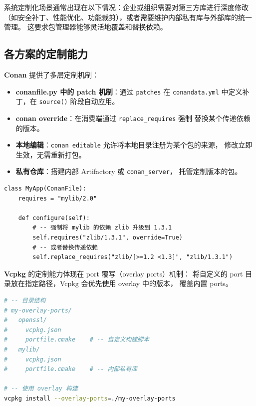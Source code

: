 \documentclass[12pt,a4paper,fontset=fandol]{ctexbook}
\begin{document}
系统定制化场景通常出现在以下情况：企业或组织需要对第三方库进行深度修改
（如安全补丁、性能优化、功能裁剪），或者需要维护内部私有库与外部库的统一管理。
这要求包管理器能够灵活地覆盖和替换依赖。

\subsection{各方案的定制能力}

\textbf{Conan} 提供了多层定制机制：

\begin{itemize}[nosep]
  \item \textbf{conanfile.py 中的 patch 机制}：通过 \texttt{patches} 在
        \texttt{conandata.yml} 中定义补丁，在 \texttt{source()} 阶段自动应用。
  \item \textbf{conan override}：在消费端通过 \texttt{replace\_requires} 强制
        替换某个传递依赖的版本。
  \item \textbf{本地编辑}：\texttt{conan editable} 允许将本地目录注册为某个包的来源，
        修改立即生效，无需重新打包。
  \item \textbf{私有仓库}：搭建内部 Artifactory 或 \texttt{conan\_server}，
        托管定制版本的包。
\end{itemize}

\begin{lstlisting}[language=Conan, caption={Conan 依赖覆盖}]
class MyApp(ConanFile):
    requires = "mylib/2.0"

    def configure(self):
        # -- 强制将 mylib 的依赖 zlib 升级到 1.3.1
        self.requires("zlib/1.3.1", override=True)
        # -- 或者替换传递依赖
        self.replace_requires("zlib/[>=1.2 <1.3]", "zlib/1.3.1")
\end{lstlisting}

\textbf{Vcpkg} 的定制能力体现在 port 覆写（overlay ports）机制：
将自定义的 port 目录放在指定路径，Vcpkg 会优先使用 overlay 中的版本，
覆盖内置 ports。

\begin{lstlisting}[language=Bash, caption={Vcpkg overlay ports}]
# -- 目录结构
# my-overlay-ports/
#   openssl/
#     vcpkg.json
#     portfile.cmake    # -- 自定义构建脚本
#   mylib/
#     vcpkg.json
#     portfile.cmake    # -- 内部私有库

# -- 使用 overlay 构建
vcpkg install --overlay-ports=./my-overlay-ports
\end{lstlisting}
\end{document}
